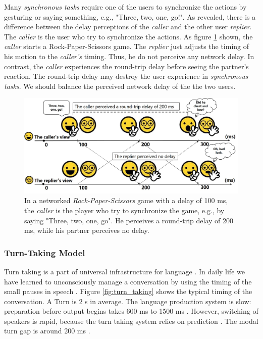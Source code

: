 Many \emph{synchronous tasks} require one of the users to synchronize the actions by gesturing or saying something, e.g., "Three, two, one, go!". As \cite{hashimoto2006influences} revealed, there is a difference between the delay perceptions of the \emph{caller} and the other user \emph{replier}. The \emph{caller} is the user who try to synchronize the actions. As figure \ref{fig:caller_and_replier} shown, the \emph{caller} starts a Rock-Paper-Scissors game. The \emph{replier} just adjusts the timing of his motion to the \emph{caller's} timing. Thus, he do not perceive any network delay. In contrast, the \emph{caller} experiences the round-trip delay before seeing the partner's reaction. The round-trip delay may destroy the user experience in \emph{synchronous tasks}. We should balance the perceived network delay of the the two users.

\begin{figure}[!htbp]
\centering
\includegraphics[width=1.0\linewidth]{figures/figure_caller_and_replier.jpg}
\caption{In a networked \emph{Rock-Paper-Scissors} game with a delay of 100 ms, the \emph{caller} is the player who try to synchronize the game, e.g., by saying "Three, two, one, go". He perceives a round-trip delay of 200 ms, while his partner perceives no delay.}
\label{fig:caller_and_replier}
\end{figure}

\subsubsection{Turn-Taking Model}

Turn taking is a part of universal infrastructure for language \cite{levinson2016turn}. In daily life we have learned to unconsciously manage a conversation by using the timing of the small pauses in speech \cite{sacks1978simplest}. Figure \ref{fig:turn_taking} shows the typical timing of the conversation. A Turn is 2 s in average. The language production system is slow: preparation before output begins takes 600 ms to 1500 ms \cite{indefrey2004spatial, bates2003timed, griffin2000eyes}. However, switching of speakers is rapid, because the turn taking system relies on prediction \cite{levinson2016turn}. The modal turn gap is around 200 ms \cite{levinson2015timing}.

